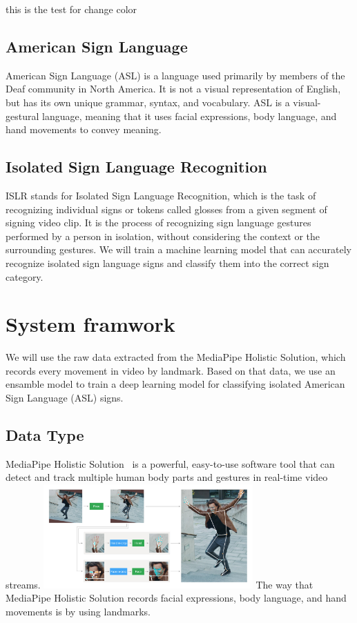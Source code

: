 \documentclass[10pt,twocolumn,letterpaper]{article}
\begin{document}
\begin{CJK*}{UTF8}{bsmi}
{\color{blue} this 
is the test for change 
color}

\subsection{American Sign Language}

American Sign Language (ASL) is a language used primarily by members of the Deaf community in North America. 
It is not a visual representation of English, but has its own unique grammar, syntax, and vocabulary. 
ASL is a visual-gestural language, meaning that it uses facial expressions, body language, and hand movements to convey meaning.

\subsection{Isolated Sign Language Recognition}

ISLR stands for Isolated Sign Language Recognition, which is the task of recognizing individual signs or tokens called glosses from a given segment of signing video clip.
It is the process of recognizing sign language gestures performed by a person in isolation, without considering the context or the surrounding gestures. 
We will train a machine learning model that can accurately recognize isolated sign language signs and classify them into the correct sign category.

\section{System framwork}
\label{sec:formatting}

We will use the raw data extracted from the MediaPipe Holistic Solution, which records every movement in video by landmark.
Based on that data, we use an ensamble model to train a deep learning model for classifying isolated American Sign Language (ASL) signs.

\subsection{Data Type}
MediaPipe Holistic Solution~\cite{https://doi.org/10.48550/arxiv.1906.08172} is a powerful, easy-to-use software tool that can detect and track multiple human body parts and gestures in real-time video streams. 
\includegraphics[width=80mm]{holistic_pipeline_example}
The way that MediaPipe Holistic Solution records facial expressions, body language, and hand movements is by using landmarks.


\end{CJK*}
\end{document}
